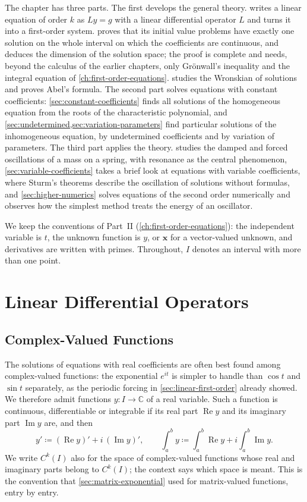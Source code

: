 The chapter has three parts. The first develops the general theory.  writes a linear equation of order $k$ as $Ly=g$ with a linear differential operator $L$ and turns it into a first-order system.  proves that its initial value problems have exactly one solution on the whole interval on which the coefficients are continuous, and deduces the dimension of the solution space; the proof is complete and needs, beyond the calculus of the earlier chapters, only Gr\"onwall's inequality and the integral equation of \cref{ch:first-order-equations}.  studies the Wronskian of solutions and proves Abel's formula. The second part solves equations with constant coefficients: \cref{sec:constant-coefficients} finds all solutions of the homogeneous equation from the roots of the characteristic polynomial, and \cref{sec:undetermined,sec:variation-parameters} find particular solutions of the inhomogeneous equation, by undetermined coefficients and by variation of parameters. The third part applies the theory.  studies the damped and forced oscillations of a mass on a spring, with resonance as the central phenomenon, \cref{sec:variable-coefficients} takes a brief look at equations with variable coefficients, where Sturm's theorems describe the oscillation of solutions without formulas, and \cref{sec:higher-numerics} solves equations of the second order numerically and observes how the simplest method treats the energy of an oscillator.

We keep the conventions of Part~II (\cref{ch:first-order-equations}): the independent variable is $t$, the unknown function is $y$, or $\mathbf x$ for a vector-valued unknown, and derivatives are written with primes. Throughout, $I$ denotes an interval with more than one point.

\section{Linear Differential Operators}
\label{sec:linear-operators}

\subsection{Complex-Valued Functions}

The solutions of equations with real coefficients are often best found among complex-valued functions: the exponential $e^{it}$ is simpler to handle than $\cos t$ and $\sin t$ separately, as the periodic forcing in \cref{sec:linear-first-order} already showed. We therefore admit functions $y\colon I\to\mathbb C$ of a real variable. Such a function is continuous, differentiable or integrable if its real part $\operatorname{Re}y$ and its imaginary part $\operatorname{Im}y$ are, and then
\[
y'\coloneqq(\operatorname{Re}y)'+i\,(\operatorname{Im}y)',\qquad\int_a^by\coloneqq\int_a^b\operatorname{Re}y+i\int_a^b\operatorname{Im}y .
\]
We write $C^k(I)$ also for the space of complex-valued functions whose real and imaginary parts belong to $C^k(I)$; the context says which space is meant. This is the convention that \cref{sec:matrix-exponential} used for matrix-valued functions, entry by entry.

